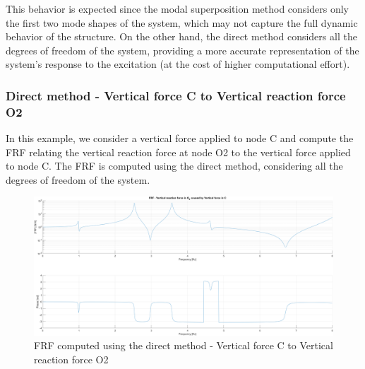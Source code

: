 This behavior is expected since the modal superposition method considers only the first two mode shapes of the system, which may not capture the full dynamic behavior of the structure.
On the other hand, the direct method considers all the degrees of freedom of the system, providing a more accurate representation of the system's response to the excitation (at the cost of higher computational effort).


\subsubsection{Direct method - Vertical force C to Vertical reaction force O2}
\label{subsubsec:direct_method_vertical_force_C}

In this example, we consider a vertical force applied to node C and compute the FRF relating the vertical reaction force at node O2 to the vertical force applied to node C.
The FRF is computed using the direct method, considering all the degrees of freedom of the system.

\begin{figure}[H]
    \centering
    \includegraphics[width=\textwidth]{img/MATLAB/FRFs/Reaction_O2.png}
    \caption{FRF computed using the direct method - Vertical force C to Vertical reaction force O2}
    \label{fig:FRF_direct_vertical_C}
\end{figure}
